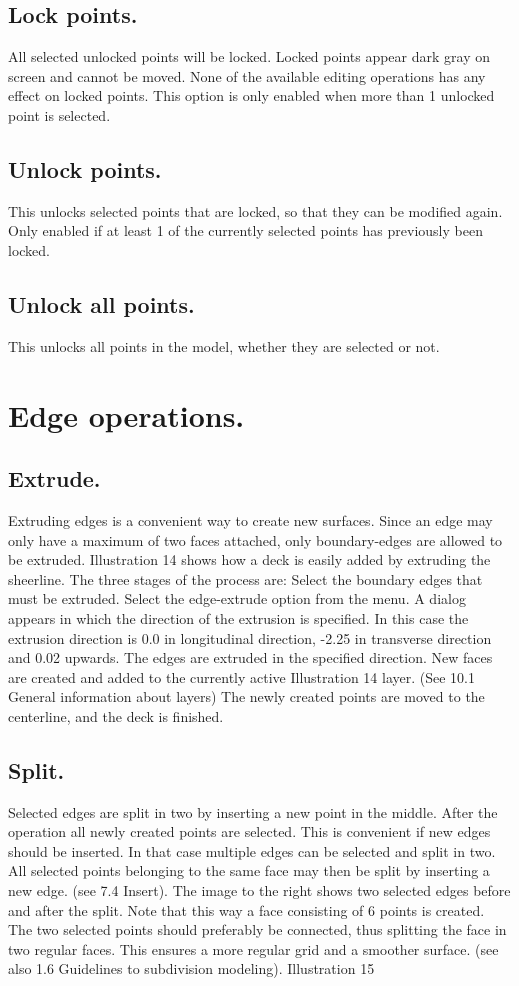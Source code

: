 \documentclass[12pt]{article}
\begin{document}
\subsection{Lock points.}
All selected unlocked points will be locked. Locked points appear dark gray on screen and cannot
be moved. None of the available editing operations has any effect on locked points. This option is
only enabled when more than 1 unlocked point is selected.

\subsection{Unlock points.}
This unlocks selected points that are locked, so that they can be modified again. Only enabled if at
least 1 of the currently selected points has previously been locked.

\subsection{Unlock all points.}
This unlocks all points in the model, whether they are selected or not.

\section{Edge operations.}

\subsection{Extrude.}
Extruding edges is a convenient way to create new surfaces.
Since an edge may only have a maximum of two faces
attached, only boundary-edges are allowed to be extruded.
Illustration 14 shows how a deck is easily added by extruding
the sheerline. The three stages of the process are:
Select the boundary edges that must be extruded.
Select the edge-extrude option from the menu. A
dialog appears in which the direction of the extrusion is
specified. In this case the extrusion direction is 0.0 in
longitudinal direction, -2.25 in transverse direction and
0.02 upwards.
The edges are extruded in the specified direction. New
faces are created and added to the currently active
 Illustration 14
layer. (See 10.1 General information about layers)
The newly created points are moved to the centerline, and the deck is finished.

\subsection{Split.}
Selected edges are split in two by inserting a new
point in the middle. After the operation all newly
created points are selected. This is convenient if new
edges should be inserted. In that case multiple edges
can be selected and split in two. All selected points
belonging to the same face may then be split by
inserting a new edge. (see 7.4 Insert). The image to
the right shows two selected edges before and after
the split. Note that this way a face consisting of 6
points is created. The two selected points should
preferably be connected, thus splitting the face in two
regular faces. This ensures a more regular grid and a
smoother surface. (see also 1.6 Guidelines to
subdivision modeling).
Illustration 15
\end{document}
